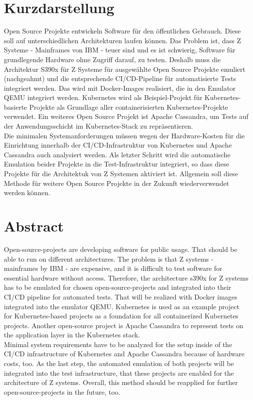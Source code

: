 \thispagestyle{empty}
\section*{Kurzdarstellung}
\label{sec:kurzdarstellung}
Open Source Projekte entwickeln Software für den öffentlichen Gebrauch. Diese soll auf unterschiedlichen Architekturen laufen können. Das Problem ist, dass Z Systeme - Mainframes von IBM - teuer sind und es ist schwierig, Software für grundlegende Hardware ohne Zugriff darauf, zu testen. Deshalb muss die Architektur S390x für Z Systeme für ausgewählte Open Source Projekte emuliert (nachgeahmt) und die entsprechende CI/CD-Pipeline für automatisierte Tests integriert werden. Das wird mit Docker-Images realisiert, die in den Emulator QEMU integriert werden. Kubernetes wird als Beispiel-Projekt für Kubernetes-basierte Projekte als Grundlage aller containerisierten Kubernetes-Projekte verwendet. Ein weiteres Open Source Projekt ist Apache Cassandra, um Tests auf der Anwendungsschicht im Kubernetes-Stack zu repräsentieren. \\
Die minimalen Systemanforderungen müssen wegen der Hardware-Kosten für die Einrichtung innerhalb der CI/CD-Infrastruktur von Kubernetes und Apache Cassandra auch analysiert werden. Als letzter Schritt wird die automatische Emulation beider Projekte in die Test-Infrastruktur integriert, so dass diese Projekte für die Architektuk von Z Systemen aktiviert ist. Allgemein soll diese Methode für weitere Open Source Projekte in der Zukunft wiederverwendet werden können.



\section*{Abstract}
\label{sec:abstract}

Open-source-projects are developing software for public usage. That should be able to run on different architectures. The problem is that Z systems - mainframes by IBM - are expensive, and it is difficult to test software for essential hardware without access. Therefore, the architecture s390x for Z systems has to be emulated for chosen open-source-projects and integrated into their CI/CD pipeline for automated tests. That will be realized with Docker images integrated into the emulator QEMU. Kubernetes is used as an example project for Kubernetes-based projects as a foundation for all containerized Kubernetes projects. Another open-source project is Apache Cassandra to represent tests on the application layer in the
Kubernetes stack. \\
Minimal system requirements have to be analyzed for the setup inside of the CI/CD infrastructure of Kubernetes and Apache Cassandra because of hardware costs, too. As the last step, the automated emulation of both projects will be integrated into the test infrastructure, that these projects are enabled for the architecture of Z systems. Overall, this method should be
reapplied for further open-source-projects in the future, too.


